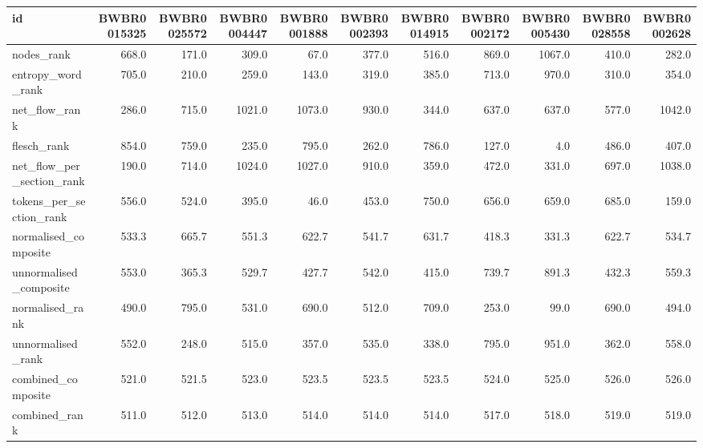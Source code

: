 \begin{tabular}{lrrrrrrrrrr}
\toprule
id & BWBR0015325 & BWBR0025572 & BWBR0004447 & BWBR0001888 & BWBR0002393 & BWBR0014915 & BWBR0002172 & BWBR0005430 & BWBR0028558 & BWBR0002628 \\
\midrule
nodes\_rank & 668.0 & 171.0 & 309.0 & 67.0 & 377.0 & 516.0 & 869.0 & 1067.0 & 410.0 & 282.0 \\
\cline{1-11}
entropy\_word\_rank & 705.0 & 210.0 & 259.0 & 143.0 & 319.0 & 385.0 & 713.0 & 970.0 & 310.0 & 354.0 \\
\cline{1-11}
net\_flow\_rank & 286.0 & 715.0 & 1021.0 & 1073.0 & 930.0 & 344.0 & 637.0 & 637.0 & 577.0 & 1042.0 \\
\cline{1-11}
flesch\_rank & 854.0 & 759.0 & 235.0 & 795.0 & 262.0 & 786.0 & 127.0 & 4.0 & 486.0 & 407.0 \\
\cline{1-11}
net\_flow\_per\_section\_rank & 190.0 & 714.0 & 1024.0 & 1027.0 & 910.0 & 359.0 & 472.0 & 331.0 & 697.0 & 1038.0 \\
\cline{1-11}
tokens\_per\_section\_rank & 556.0 & 524.0 & 395.0 & 46.0 & 453.0 & 750.0 & 656.0 & 659.0 & 685.0 & 159.0 \\
\cline{1-11}
normalised\_composite & 533.3 & 665.7 & 551.3 & 622.7 & 541.7 & 631.7 & 418.3 & 331.3 & 622.7 & 534.7 \\
\cline{1-11}
unnormalised\_composite & 553.0 & 365.3 & 529.7 & 427.7 & 542.0 & 415.0 & 739.7 & 891.3 & 432.3 & 559.3 \\
\cline{1-11}
normalised\_rank & 490.0 & 795.0 & 531.0 & 690.0 & 512.0 & 709.0 & 253.0 & 99.0 & 690.0 & 494.0 \\
\cline{1-11}
unnormalised\_rank & 552.0 & 248.0 & 515.0 & 357.0 & 535.0 & 338.0 & 795.0 & 951.0 & 362.0 & 558.0 \\
\cline{1-11}
combined\_composite & 521.0 & 521.5 & 523.0 & 523.5 & 523.5 & 523.5 & 524.0 & 525.0 & 526.0 & 526.0 \\
\cline{1-11}
combined\_rank & 511.0 & 512.0 & 513.0 & 514.0 & 514.0 & 514.0 & 517.0 & 518.0 & 519.0 & 519.0 \\
\cline{1-11}
\bottomrule
\end{tabular}
